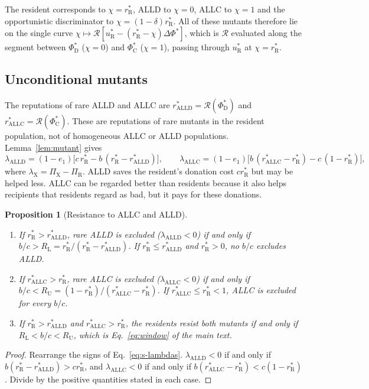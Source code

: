 \documentclass[fleqn,10pt]{wlscirep}
\newcommand{\Rmap}{\mathscr{R}}            %
\newcommand{\rR}{r_{\mathrm{R}}^{*}}
\newcommand{\uR}{u_{\mathrm{R}}^{*}}
\newcommand{\dPhi}{\Delta\Phi^{*}}
\newcommand{\ALLC}{\mathrm{ALLC}}
\newcommand{\ALLD}{\mathrm{ALLD}}
\theoremstyle{plain}
\newtheorem{proposition}[lemma]{Proposition}
\begin{document}
The resident corresponds to $\chi=\rR$, ALLD to $\chi=0$, ALLC to $\chi=1$ and the opportunistic discriminator to $\chi=(1-\delta)\rR$. All of these mutants therefore lie on the single curve $\chi\mapsto\Rmap[\uR-(\rR-\chi)\dPhi]$, which is $\Rmap$ evaluated along the segment between $\Phi^*_{\mathrm D}$ ($\chi=0$) and $\Phi^*_{\mathrm C}$ ($\chi=1$), passing through $\uR$ at $\chi=\rR$.

\subsection{Unconditional mutants}
\label{si:unconditional}

The reputations of rare ALLD and ALLC are $r^*_{\ALLD}=\Rmap(\Phi^*_{\mathrm D})$ and $r^*_{\ALLC}=\Rmap(\Phi^*_{\mathrm C})$. These are reputations of rare mutants in the resident population, not of homogeneous ALLC or ALLD populations. Lemma~\ref{lem:mutant} gives
\begin{equation}
\lambda_{\ALLD}=(1-e_1)\bigl[c\,\rR-b\,(\rR-r^*_{\ALLD})\bigr],\qquad
\lambda_{\ALLC}=(1-e_1)\bigl[b\,(r^*_{\ALLC}-\rR)-c\,(1-\rR)\bigr],
\label{eq:s-lambdas}
\end{equation}
where $\lambda_{\mathrm X}=\Pi_{\mathrm X}-\Pi_{\mathrm R}$. ALLD saves the resident's donation cost $c\rR$ but may be helped less. ALLC can be regarded better than residents because it also helps recipients that residents regard as bad, but it pays for these donations.

\begin{proposition}[Resistance to ALLC and ALLD]\label{prop:window}
\begin{enumerate}
\item[(a)] If $\rR>r^*_{\ALLD}$, rare ALLD is excluded ($\lambda_{\ALLD}<0$) if and only if $b/c>R_{\mathrm L}=\rR/(\rR-r^*_{\ALLD})$. If $\rR\leq r^*_{\ALLD}$ and $\rR>0$, no $b/c$ excludes ALLD.
\item[(b)] If $r^*_{\ALLC}>\rR$, rare ALLC is excluded ($\lambda_{\ALLC}<0$) if and only if $b/c<R_{\mathrm U}=(1-\rR)/(r^*_{\ALLC}-\rR)$. If $r^*_{\ALLC}\leq\rR<1$, ALLC is excluded for every $b/c$.
\item[(c)] If $\rR>r^*_{\ALLD}$ and $r^*_{\ALLC}>\rR$, the residents resist both mutants if and only if $R_{\mathrm L}<b/c<R_{\mathrm U}$, which is Eq.~\eqref{eq:window} of the main text.
\end{enumerate}
\end{proposition}
\begin{proof}
Rearrange the signs of Eq.~\eqref{eq:s-lambdas}. $\lambda_{\ALLD}<0$ if and only if $b(\rR-r^*_{\ALLD})>c\rR$, and $\lambda_{\ALLC}<0$ if and only if $b(r^*_{\ALLC}-\rR)<c(1-\rR)$. Divide by the positive quantities stated in each case.
\end{proof}
\end{document}
